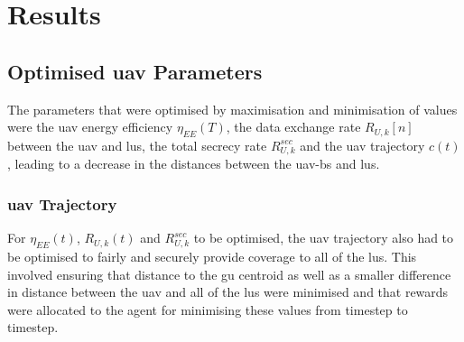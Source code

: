 \chapter{Results}
\label{chap_results}
\section{Optimised \texorpdfstring{\acrshort{uav}}{UAV} Parameters}
The parameters that were optimised by maximisation and minimisation of values were the \acrshort{uav} energy efficiency $\eta_{EE} (T)$, the data exchange rate $R_{U, k} [n]$ between the \acrshort{uav} and \acrshort{lu}s, the total secrecy rate $R_{U, k}^{sec}$ and the \acrshort{uav} trajectory $c(t)$, leading to a decrease in the distances between the \acrshort{uav}-\acrshort{bs} and \acrshort{lu}s. 
\subsection{\texorpdfstring{\acrshort{uav}}{UAV} Trajectory}
For $\eta_{EE}(t)$, $R_{U, k} (t)$ and $R_{U, k}^{sec}$ to be optimised, the \acrshort{uav} trajectory also had to be optimised to fairly and securely provide coverage to all of the \acrshort{lu}s. 
This involved ensuring that distance to the \acrshort{gu} centroid as well as a smaller difference in distance between the \acrshort{uav} and all of the \acrshort{lu}s were minimised and that rewards were allocated to the agent for minimising these values from timestep to timestep. 

